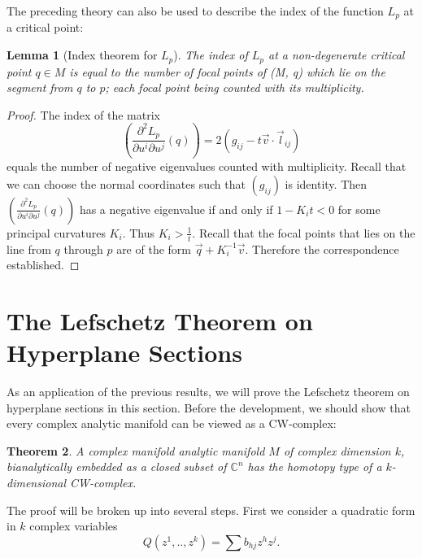 \documentclass[a4paper,11pt,reqno]{amsart}
\newtheorem{thm}{Theorem}[section]
\newtheorem{lem}[thm]{Lemma}
\newcommand{\CC}{\mathbb{C}}
\newcommand{\vect}[1]{\vec{#1}}
\begin{document}
The preceding theory can also be used to describe the index of the function
$L_p$ at a critical point:

\begin{lem}[Index theorem for $L_p$]
  \label{index}
  \label{index_of_Lp}
  The index of $L_p$ at a non-degenerate critical point $q \in M$ is equal to
  the number of focal points of (M, q) which lie on the segment from $q$ to $p$;
  each focal point being counted with its multiplicity.
\end{lem}

\begin{proof}
  The index of the matrix 
  \begin{equation}
    \left( \frac{\partial^2 L_p}{\partial u^i \partial
        u^j}(q) \right) = 2(g_{ij}-t\vect{v} \cdot \vect{l}_{ij})
  \end{equation}
  equals the number of negative eigenvalues counted with multiplicity. Recall
  that we can choose the normal coordinates such that $(g_{ij})$ is
  identity. Then$\left( \frac{\partial^2 L_p}{\partial u^i \partial u^j}(q)
  \right)$ has a negative eigenvalue if and only if $1-K_it < 0$ for some
  principal curvatures $K_i$. Thus $K_i > \frac{1}{t}$. Recall that the focal
  points that lies on the line from $q$ through $p$ are of the form
  $\vect{q}+K_i^{-1}\vect{v}$. Therefore the correspondence established.
  
\end{proof}

\section{The Lefschetz Theorem on Hyperplane Sections}

As an application of the previous results, we will prove the Lefschetz theorem
on hyperplane sections in this section. Before the development, we should show
that every complex analytic manifold can be viewed as a CW-complex:

\begin{thm}
  A complex manifold analytic manifold $M$ of complex dimension $k$,
  bianalytically embedded as a closed subset of $\CC^n$ has the homotopy type of
  a $k$-dimensional CW-complex.
\end{thm}

The proof will be broken up into several steps. First we consider a quadratic
form in $k$ complex variables
\begin{equation}
  Q(z^1, .., z^k) = \sum b_{hj}z^hz^j.
\end{equation}
\end{document}
